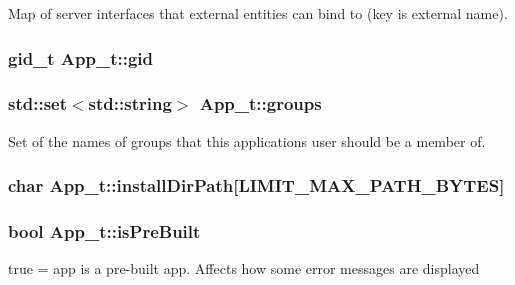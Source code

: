 Map of server interfaces that external entities can bind to (key is external name). 

\subsubsection[{\texorpdfstring{gid}{gid}}]{\setlength{\rightskip}{0pt plus 5cm}gid\+\_\+t App\+\_\+t\+::gid}\hypertarget{struct_app__t_a2569f3015e70560e72a376bdd80c1f55}{}\label{struct_app__t_a2569f3015e70560e72a376bdd80c1f55}
\subsubsection[{\texorpdfstring{groups}{groups}}]{\setlength{\rightskip}{0pt plus 5cm}std\+::set$<$std\+::string$>$ App\+\_\+t\+::groups}\hypertarget{struct_app__t_a740ba5348c4bf0ad1c5744118c3447d4}{}\label{struct_app__t_a740ba5348c4bf0ad1c5744118c3447d4}


Set of the names of groups that this application\textquotesingle{}s user should be a member of. 

\subsubsection[{\texorpdfstring{install\+Dir\+Path}{installDirPath}}]{\setlength{\rightskip}{0pt plus 5cm}char App\+\_\+t\+::install\+Dir\+Path\mbox{[}{\bf L\+I\+M\+I\+T\+\_\+\+M\+A\+X\+\_\+\+P\+A\+T\+H\+\_\+\+B\+Y\+T\+ES}\mbox{]}}\hypertarget{struct_app__t_ad8e250fb083e7ecc502c5edd6fee73e7}{}\label{struct_app__t_ad8e250fb083e7ecc502c5edd6fee73e7}
\subsubsection[{\texorpdfstring{is\+Pre\+Built}{isPreBuilt}}]{\setlength{\rightskip}{0pt plus 5cm}bool App\+\_\+t\+::is\+Pre\+Built}\hypertarget{struct_app__t_aa70df224d5a7c415546d26f79a083185}{}\label{struct_app__t_aa70df224d5a7c415546d26f79a083185}
true = app is a pre-\/built app. Affects how some error messages are displayed 
